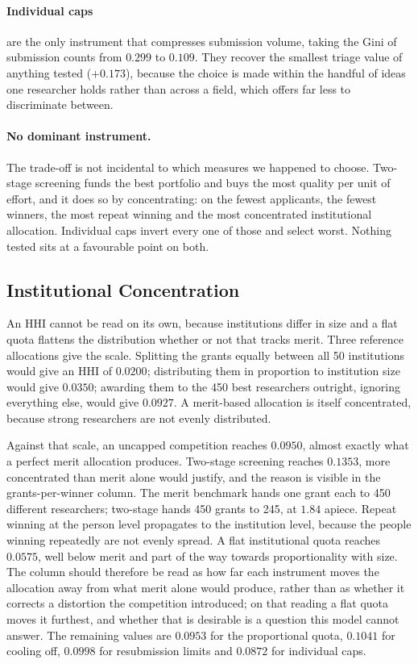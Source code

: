 \documentclass[11pt,a4paper]{article}
\begin{document}
\paragraph{Individual caps} are the only instrument that compresses submission
volume, taking the Gini of submission counts from $0.299$ to $0.109$. They recover
the smallest triage value of anything tested ($+0.173$), because the choice is
made within the handful of ideas one researcher holds rather than across a field,
which offers far less to discriminate between.

\paragraph{No dominant instrument.} The trade-off is not incidental to which
measures we happened to choose. Two-stage screening funds the best portfolio and
buys the most quality per unit of effort, and it does so by concentrating: on the
fewest applicants, the fewest winners, the most repeat winning and the most
concentrated institutional allocation. Individual caps invert every one of those
and select worst. Nothing tested sits at a favourable point on both.

\subsection{Institutional Concentration}
\label{sec:hhi}

An HHI cannot be read on its own, because institutions differ in size and a flat
quota flattens the distribution whether or not that tracks merit. Three reference
allocations give the scale. Splitting the grants equally between all 50
institutions would give an HHI of $0.0200$; distributing them in proportion to
institution size would give $0.0350$; awarding them to the 450 best researchers
outright, ignoring everything else, would give $0.0927$. A merit-based allocation is itself
concentrated, because strong researchers are not evenly distributed.

Against that scale, an uncapped competition reaches $0.0950$, almost exactly what
a perfect merit allocation produces. Two-stage screening reaches $0.1353$, more
concentrated than merit alone would justify, and the reason is visible in the
grants-per-winner column. The merit benchmark hands one grant each to 450
different researchers; two-stage hands 450 grants to 245, at $1.84$ apiece.
Repeat winning at the person level propagates to the institution level, because
the people winning repeatedly are not evenly spread. A flat
institutional quota reaches $0.0575$, well below merit and part of the way towards
proportionality with size. The column should therefore be read as how far each
instrument moves the allocation away from what merit alone would produce, rather
than as whether it corrects a distortion the competition introduced; on that
reading a flat quota moves it furthest, and whether that is desirable is a
question this model cannot answer. The remaining values are $0.0953$ for the
proportional quota, $0.1041$ for cooling off, $0.0998$ for resubmission limits and
$0.0872$ for individual caps.
\end{document}
